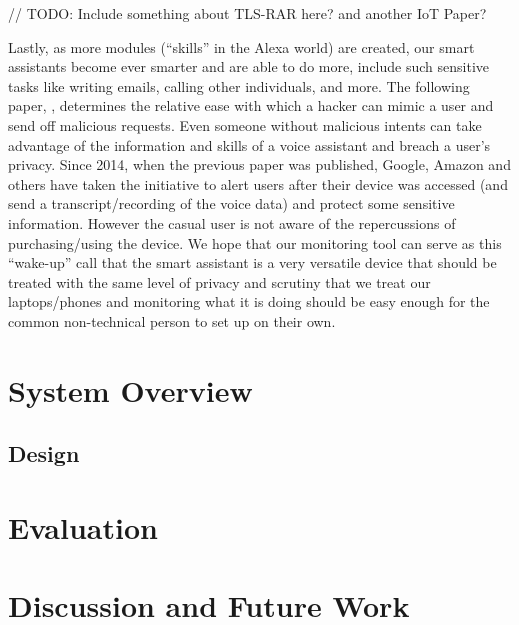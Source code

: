 \documentclass[letterpaper,twocolumn,10pt]{article}
\begin{document}
// TODO: Include something about TLS-RAR here? and another IoT Paper?

Lastly, as more modules (“skills” in the Alexa world) are created, our smart assistants become ever smarter and are able to do more, include such sensitive tasks like writing emails, calling other individuals, and more. The following paper, \cite[Diao et al]{Diao:2014:YVA:2666620.2666623}, determines the relative ease with which a hacker can mimic a user and send off malicious requests. Even someone without malicious intents can take advantage of the information and skills of a voice assistant and breach a user’s privacy. Since 2014, when the previous paper was published, Google, Amazon and others have taken the initiative to alert users after their device was accessed (and send a transcript/recording of the voice data) and protect some sensitive information. However the casual user is not aware of the repercussions of purchasing/using the device. We hope that our monitoring tool can serve as this “wake-up” call that the smart assistant is a very versatile device that should be treated with the same level of privacy and scrutiny that we treat our laptops/phones and monitoring what it is doing should be easy enough for the common non-technical person to set up on their own.

\section{System Overview}

\subsection{Design}

\section{Evaluation}

\section{Discussion and Future Work}
\end{document}
